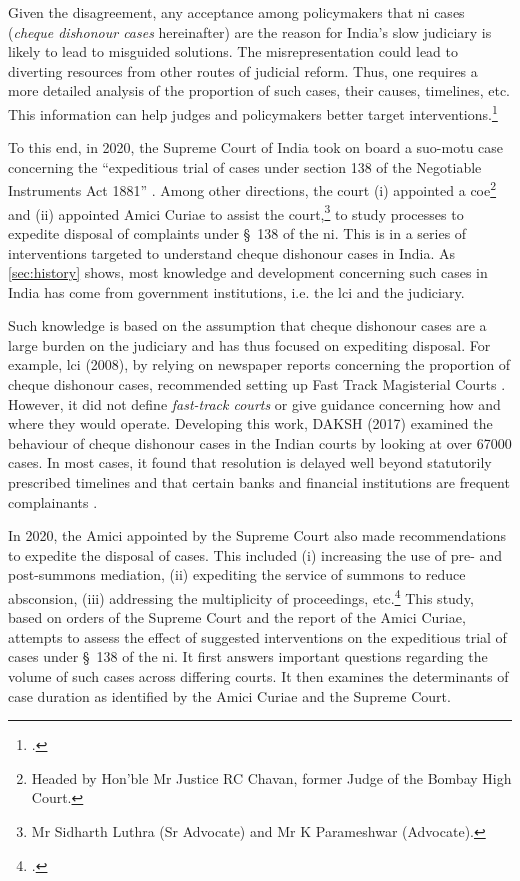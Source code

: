 \documentclass[12pt,a4paper]{article}
\begin{document}
Given the disagreement, any acceptance among policymakers that \gls{ni} cases (\textit{cheque dishonour cases} hereinafter) are the reason for India's slow judiciary is likely to lead to misguided solutions. The misrepresentation could lead to diverting resources from other routes of judicial reform. Thus, one requires a more detailed analysis of the proportion of such cases, their causes, timelines, etc. This information can help judges and policymakers better target interventions.\footcite[For the importance of accurate judicial data, see][]{damle2020_ecourtsData, daksh2020_data, damle2020_land}

To this end, in 2020, the Supreme Court of India took on board a suo-motu case concerning the “expeditious trial of cases under section 138 of the Negotiable Instruments Act 1881” \autocite{sc2020_138}. Among other directions, the court (i) appointed a \gls{coe}\footnote{Headed by Hon’ble Mr Justice RC Chavan, former Judge of the Bombay High Court.} and (ii) appointed Amici Curiae to assist the court,\footnote{Mr Sidharth Luthra (Sr Advocate) and Mr K Parameshwar (Advocate).} to study processes to expedite disposal of complaints under \S~138 of the \gls{ni}. This is in a series of interventions targeted to understand cheque dishonour cases in India. As \cref{sec:history} shows, most knowledge and development concerning such cases in India has come from government institutions, i.e. the \gls{lci} and the judiciary.

Such knowledge is based on the assumption that cheque dishonour cases are a large burden on the judiciary and has thus focused on expediting disposal. For example, \gls{lci} (2008), by relying on newspaper reports concerning the proportion of cheque dishonour cases, recommended setting up Fast Track Magisterial Courts \autocite{lci2008_138, bhan2015_placing}. However, it did not define \textit{fast-track courts} or give guidance concerning how and where they would operate. Developing this work, DAKSH (2017) examined the behaviour of cheque dishonour cases in the Indian courts by looking at over 67000 cases. In most cases, it found that resolution is delayed well beyond statutorily prescribed timelines and that certain banks and financial institutions are frequent complainants \autocite{sridhar2017_cheque}.

In 2020, the Amici appointed by the Supreme Court also made recommendations to expedite the disposal of cases. This included (i) increasing the use of pre- and post-summons mediation, (ii) expediting the service of summons to reduce absconsion, (iii) addressing the multiplicity of proceedings, etc.\footcite[For details see ]{amicus2020_submission} This study, based on orders of the Supreme Court and the report of the Amici Curiae, attempts to assess the effect of suggested interventions on the expeditious trial of cases under \S~138 of the \gls{ni}. It first answers important questions regarding the volume of such cases across differing courts. It then examines the determinants of case duration as identified by the Amici Curiae and the Supreme Court.
\end{document}
